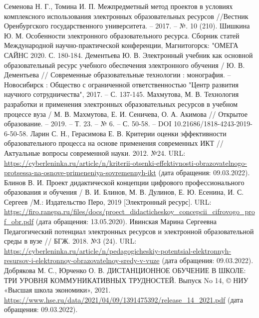 \begin{thebibliography}{99}
  Семенова Н. Г., Томина И. П. Межпредметный метод проектов в условиях комплексного использования электронных образовательных ресурсов //Вестник Оренбургского государственного университета. – 2017. – №. 10 (210).
  Шишкина  Ю. М. Особенности электронного образовательного ресурса. Сборник статей Международной научно-практической конференции, Магнитогорск: "ОМЕГА САЙНС 2020. С. 180-184.
  Дементьева Ю. В. Электронный учебник как основной образовательный ресурс учебного обеспечения электронного обучения / Ю. В. Дементьева // Современные образовательные технологии : монография. – Новосибирск : Общество с ограниченной ответственностью "Центр развития научного сотрудничества", 2017. – С. 137-145.
  Махмутова, М. В. Технология разработки и применения электронных образовательных ресурсов в учебном процессе вуза / М. В. Махмутова, Е. И. Сеничева, О. А. Акимова // Открытое образование. – 2019. – Т. 23. – № 6. – С. 50-58. – DOI 10.21686/1818-4243-2019-6-50-58.
 Ларин С. Н., Герасимова Е. В. Критерии оценки эффективности образовательного процесса на основе применения современных ИКТ // Актуальные вопросы современной науки. 2012. №24. URL: \url{https://cyberleninka.ru/article/n/kriterii-otsenki-effektivnosti-obrazovatelnogo-protsessa-na-osnove-primeneniya-sovremennyh-ikt} (дата обращения: 09.03.2022).
 Блинов В. И. Проект дидактической концепции цифрового профессионального образования и обучения / В. И. Блинов, М. В. Дулинов, Е. Ю. Есенина, И. С. Сергеев /М.: Издательство Перо, 2019 [Электронный ресурс]. URL: \url{https://firo.ranepa.ru/files/docs/proect_didacticheskoy_concepcii_cifrovogo_prof_obr.pdf} (дата обращения: 13.05.2020).
 Ивинская Марина Сергеевна Педагогический потенциал электронных ресурсов и электронной образовательной среды в вузе // БГЖ. 2018. №3 (24). URL: \url{https://cyberleninka.ru/article/n/pedagogicheskiy-potentsial-elektronnyh-resursov-i-elektronnoy-obrazovatelnoy-sredy-v-vuze} (дата обращения: 09.03.2022).
 Добрякова М. С.,  Юрченко О. В. ДИСТАНЦИОННОЕ ОБУЧЕНИЕ В ШКОЛЕ: ТРИ УРОВНЯ КОММУНИКАТИВНЫХ ТРУДНОСТЕЙ. Выпуск No 14, © НИУ «Высшая школа экономики», 2021. \url{https://www.hse.ru/data/2021/04/09/1391475392/release_14_2021.pdf} (дата обращения: 09.03.2022).
\end{thebibliography}

